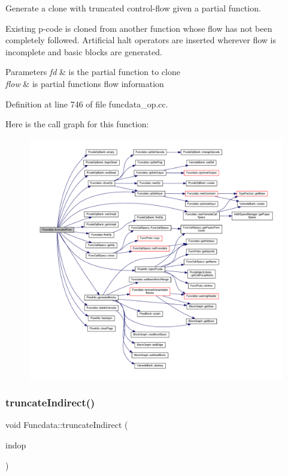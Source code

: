 Generate a clone with truncated control-\/flow given a partial function. 

Existing p-\/code is cloned from another function whose flow has not been completely followed. Artificial halt operators are inserted wherever flow is incomplete and basic blocks are generated. 
\begin{DoxyParams}{Parameters}
{\em fd} & is the partial function to clone \\
\hline
{\em flow} & is partial function\textquotesingle{}s flow information \\
\hline
\end{DoxyParams}


Definition at line 746 of file funcdata\+\_\+op.\+cc.

Here is the call graph for this function\+:
\nopagebreak
\begin{figure}[H]
\begin{center}
\leavevmode
\includegraphics[width=350pt]{class_funcdata_a122718ad87c13b714676c61050461388_cgraph}
\end{center}
\end{figure}
\mbox{\label{class_funcdata_a964a7c66123c0b8ed931cf131521ecdf}} 
\subsubsection{\texorpdfstring{truncateIndirect()}{truncateIndirect()}}
{\footnotesize\ttfamily void Funcdata\+::truncate\+Indirect (\begin{DoxyParamCaption}\item[{\mbox{\hyperlink{class_pcode_op}{Pcode\+Op}} $\ast$}]{indop }\end{DoxyParamCaption})}




